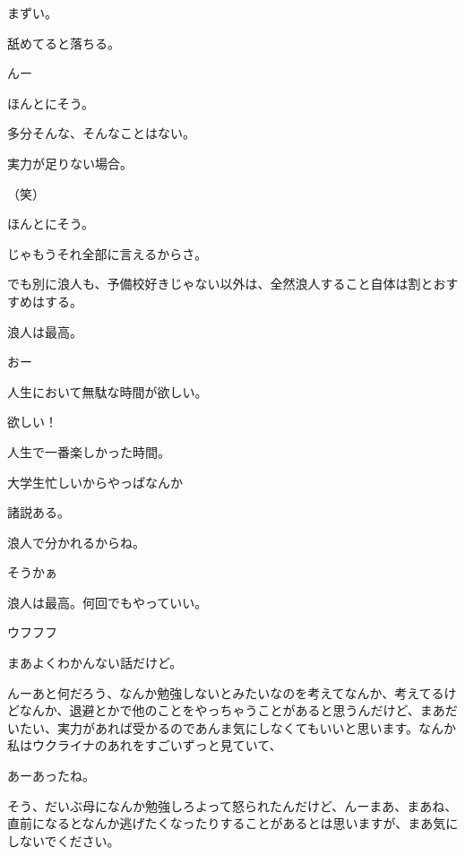 \begin{multicols}{3}
{        まずい。

        舐めてると落ちる。

        んー

        ほんとにそう。

        多分そんな、そんなことはない。

        実力が足りない場合。

        （笑）

        ほんとにそう。

        じゃもうそれ全部に言えるからさ。

        でも別に浪人も、予備校好きじゃない以外は、全然浪人すること自体は割とおすすめはする。

        浪人は最高。

        おー

        人生において無駄な時間が欲しい。

        欲しい！

        人生で一番楽しかった時間。

        大学生忙しいからやっぱなんか

        諸説ある。

        浪人で分かれるからね。

        そうかぁ

        浪人は最高。何回でもやっていい。

        ウフフフ

        まあよくわかんない話だけど。

        んーあと何だろう、なんか勉強しないとみたいなのを考えてなんか、考えてるけどなんか、退避とかで他のことをやっちゃうことがあると思うんだけど、まあだいたい、実力があれば受かるのであんま気にしなくてもいいと思います。なんか私はウクライナのあれをすごいずっと見ていて、

        あーあったね。

        そう、だいぶ母になんか勉強しろよって怒られたんだけど、んーまあ、まあね、直前になるとなんか逃げたくなったりすることがあるとは思いますが、まあ気にしないでください。

}
\end{multicols}
